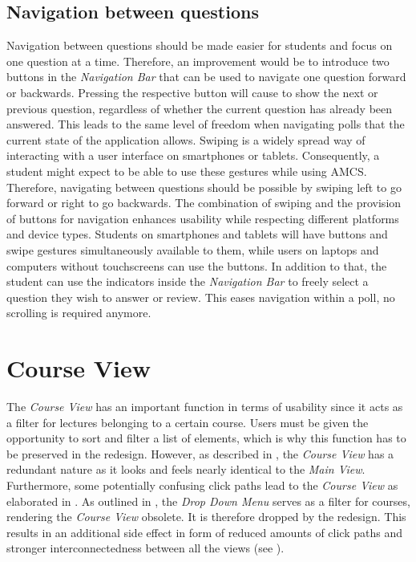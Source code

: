 \subsection{Navigation between questions}

Navigation between questions should be made easier for students and focus on one question at a time. Therefore, an improvement would be to introduce two buttons in the \emph{Navigation Bar} that can be used to navigate one question forward or backwards. Pressing the respective button will cause to show the next or previous question, regardless of whether the current question has already been answered. This leads to the same level of freedom when navigating polls that the current state of the application allows.
\newline
\newline
Swiping is a widely spread way of interacting with a user interface on smartphones or tablets. Consequently, a student might expect to be able to use these gestures while using AMCS. Therefore, navigating between questions should be possible by swiping left to go forward or right to go backwards. The combination of swiping and the provision of buttons for navigation enhances usability while respecting different platforms and device types. Students on smartphones and tablets will have buttons and swipe gestures simultaneously available to them, while users on laptops and computers without touchscreens can use the buttons.
In addition to that, the student can use the indicators inside the \emph{Navigation Bar} to freely select a question they wish to answer or review. This eases navigation within a poll, no scrolling is required anymore.


\section{Course View}
The \emph{Course View} has an important function in terms of usability since it acts as a filter for lectures belonging to a certain course. Users must be given the opportunity to sort and filter a list of elements, which is why this function has to be preserved in the redesign. However, as described in , the \emph{Course View} has a redundant nature as it looks and feels nearly identical to the \emph{Main View}.
Furthermore, some potentially confusing click paths lead to the \emph{Course View} as elaborated in .
As outlined in , the \emph{Drop Down Menu} serves as a filter for courses, rendering the \emph{Course View} obsolete. It is therefore dropped by the redesign. This results in an additional side effect in form of reduced amounts of click paths and stronger interconnectedness between all the views (see \todosct).
